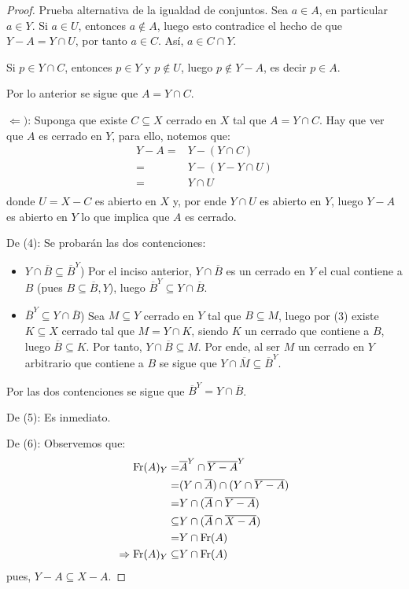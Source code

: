 \documentclass[12pt]{report}
\theoremstyle{largebreak}
\newcommand{\Cls}[1]{\ensuremath{\overline{#1}}}
\newcommand{\Fr}[1]{\ensuremath{\textup{Fr}(#1)}}
\begin{document}
\begin{proof}
        Prueba alternativa de la igualdad de conjuntos. Sea $a\in A$, en particular $a\in Y$. Si $a\in U$, entonces $a\notin A$, luego esto contradice el hecho de que $Y-A=Y\cap U$, por tanto $a\in C$. Así, $a\in C\cap Y$.

        Si $p\in Y\cap C$, entonces $p\in Y$ y $p\notin U$, luego $p\notin Y-A$, es decir $p\in A$.

        Por lo anterior se sigue que $A=Y\cap C$.

        $\Leftarrow)$: Suponga que existe $C\subseteq X$ cerrado en $X$ tal que $A=Y\cap C$. Hay que ver que $A$ es cerrado en $Y$, para ello, notemos que:
        \begin{equation*}
            \begin{split}
                Y-A=&Y-(Y\cap C) \\
                =&Y-(Y-Y\cap U) \\
                =&Y\cap U \\
            \end{split}
        \end{equation*}
        donde $U=X-C$ es abierto en $X$ y, por ende $Y\cap U$ es abierto en $Y$, luego $Y-A$ es abierto en $Y$ lo que implica que $A$ es cerrado.

        De (4): Se probarán las dos contenciones:
        \begin{itemize}
            \item $Y\cap\Cls{B}\subseteq\Cls{B}^Y$) Por el inciso anterior, $Y\cap\Cls{B}$ es un cerrado en $Y$ el cual contiene a $B$ (pues $B\subseteq\Cls{B},Y$), luego $\Cls{B}^Y\subseteq Y\cap \Cls{B}$.
            \item $\Cls{B}^Y\subseteq Y\cap\Cls{B}$) Sea $M\subseteq Y$ cerrado en $Y$ tal que $B\subseteq M$, luego por (3) existe $K\subseteq X$ cerrado tal que $M=Y\cap K$, siendo $K$ un cerrado que contiene a $B$, luego $\Cls{B}\subseteq K$. Por tanto, $Y\cap \Cls{B}\subseteq M$. Por ende, al ser $M$ un cerrado en $Y$ arbitrario que contiene a $B$ se sigue que $Y\cap\Cls{M}\subseteq \Cls{B}^Y$.
        \end{itemize}

        Por las dos contenciones se sigue que $\Cls{B}^Y=Y\cap\Cls{B}$.

        De (5): Es inmediato.

        De (6): Observemos que:
        \begin{equation*}
            \begin{split}
                \Fr{A}_Y=&\Cls{A}^Y\cap\Cls{Y-A}^Y\\
                =&(Y\cap\Cls{A})\cap(Y\cap\Cls{Y-A})\\
                =&Y\cap(\Cls{A}\cap\Cls{Y-A}) \\
                \subseteq&Y\cap(\Cls{A}\cap\Cls{X-A}) \\
                =&Y\cap\Fr{A}\\
                \Rightarrow \Fr{A}_Y\subseteq& Y\cap\Fr{A}\\
            \end{split}
        \end{equation*}
        pues, $Y-A\subseteq X-A$.


\end{proof}
\end{document}
